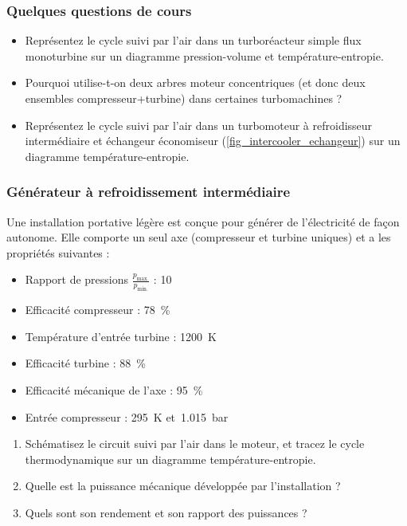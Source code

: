 \begin{boiboiboite}
	\propair
	\propgaz
	\isentropiques
\end{boiboiboite}

\subsubsection{Quelques questions de cours}

	\begin{itemize}
		\item Représentez le cycle suivi par l’air dans un turboréacteur simple flux monoturbine sur un diagramme pression-volume et température-entropie.
		\item Pourquoi utilise-t-on deux arbres moteur concentriques (et donc deux ensembles compresseur+turbine) dans certaines turbomachines ?
		\item Représentez le cycle suivi par l’air dans un turbomoteur à refroidisseur intermédiaire et échangeur économiseur (\cref{fig_intercooler_echangeur}) sur un diagramme température-entropie.
	\end{itemize}


\subsubsection{Générateur à refroidissement intermédiaire}

	Une installation portative légère est conçue pour générer de l’électricité de façon autonome. Elle comporte un seul axe (compresseur et turbine uniques) et a les propriétés suivantes :
	\begin{itemize}
		\item Rapport de pressions $\frac{p_\text{max.}}{p_\text{min.}}$ :  	\tab \num{10}
		\item Efficacité compresseur :  									\tab \SI{78}{\percent}
		\item Température d’entrée turbine : 							\tab \SI{1200}{\kelvin}
		\item Efficacité turbine : 										\tab \SI{88}{\percent}
		\item Efficacité mécanique de l’axe : 							\tab \SI{95}{\percent}
		\item Entrée compresseur : 										\tab \SI{295}{\kelvin} et~\SI{1,015}{\bar}
	\end{itemize}

	\begin{enumerate}
		\item Schématisez le circuit suivi par l’air dans le moteur, et tracez le cycle thermodynamique sur un diagramme température-entropie.
		\item Quelle est la puissance mécanique développée par l’installation ?
		\item Quels sont son rendement et son rapport des puissances ?
	\end{enumerate}
	
